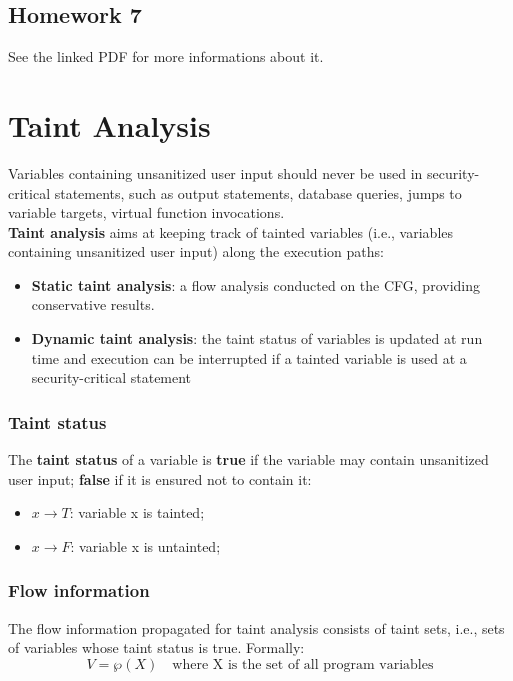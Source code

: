 \documentclass[a4paper, 10pt, titlepage]{article}
\begin{document}
\subsection{Homework 7}
See the linked PDF for more informations about it.

\newpage
\section{Taint Analysis}
Variables containing unsanitized user input should never be used in security-critical statements, such as output statements, database queries, jumps to variable targets, virtual function invocations. \medskip \\
\textbf{Taint analysis} aims at keeping track of tainted variables (i.e., variables containing unsanitized user input) along the execution paths: 
\begin{itemize}
\item \textbf{Static taint analysis}: a flow analysis conducted on the CFG, providing conservative results.
\item \textbf{Dynamic taint analysis}: the taint status of variables is updated at run time and execution can be interrupted if a tainted variable is used at a security-critical statement
\end{itemize}  
\subsubsection*{Taint status}
The \textbf{taint status} of a variable is \textbf{true} if the variable may contain unsanitized user input; \textbf{false} if it is ensured not to contain it:
\begin{itemize}
\item $x \rightarrow T$: variable x is tainted;
\item $x \rightarrow F$: variable x is untainted;
\end{itemize}

\subsubsection*{Flow information}
The flow information propagated for taint analysis consists of taint sets, i.e., sets of variables whose taint status is true. Formally: 
\begin{equation*}
V = \wp(X) \quad \text{where X is the set of all program variables}
\end{equation*}
\end{document}
